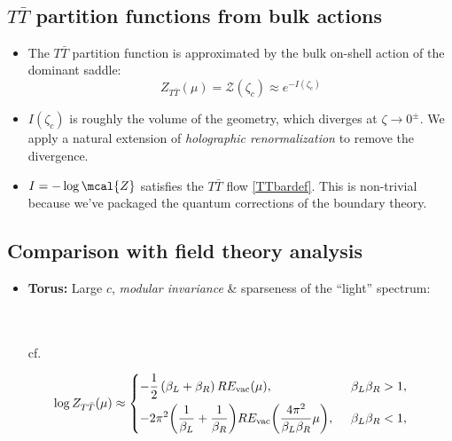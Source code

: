 \documentclass[10pt]{article}
\newcommand{\citations}[1]{{\footnotesize#1\par}}
\newcommand{\TTbar}{\texorpdfstring{\ensuremath{T\bar{T}}}{TTbar}\xspace}
\begin{document}
\begin{multicols}{3}
\begin{itemize}
\citations{
\textcite{Giveon:2017nie}\\
\textcite{Apolo:2019zai}
}
\end{itemize}

\subsection*{\TTbar partition functions from bulk actions} \label{se:partitionfunction}

\citations{
\textcite{Caputa:2020lpa}
}

\begin{itemize}
\item The \TTbar partition function is approximated by the bulk on-shell action of the dominant saddle:
	\begin{equation}
		Z_{T\bar T} (\mu) = \mathcal Z (\zeta_c) \approx  e^{-I(\zeta_c)}\label{partition2}
	\end{equation}


\item $I(\zeta_c)$ is roughly the volume of the geometry, which \mbox{diverges} at $\zeta \to 0^\pm$. We apply a natural extension of \textit{holographic renormalization} to remove the divergence.


\item $I = -\log \mcal{Z}$ satisfies the \TTbar flow \eqref{TTbardef}.
	This is non-trivial because we've packaged the quantum corrections of the boundary theory.
\end{itemize}

\subsection*{Comparison with field theory analysis}



\begin{itemize}
\item \textbf{Torus:} Large $c$, \textit{modular invariance} \& sparseness of the ``light'' spectrum:

\citations{
	\textcite{Datta:2018thy}\\
	\textcite{Apolo:2023aho}\\
	cf.~\textcite{Hartman:2014oaa}
}\vspace{-\baselineskip}
	\begin{equation*}
	\hspace{-1.5em}
		\log   Z_{T\bar T}(\mu)  \approx \left\{ \begin{aligned}
		& {-\frac{1}{2}}\,(\beta_L + \beta_R)\, RE_{\text{vac}}(\mu),  &\beta_L \beta_R > 1, \\
		& {-2 \pi^2 \bigg(\frac{1}{\beta_L} + \frac{1}{\beta_R}\bigg)  RE_{\text{vac}}\bigg(\frac{4\pi^2}{\beta_L \beta_R} \mu \bigg)}, \ \, &\beta_L\beta_R < 1, %
		 \end{aligned} \right. %
	\end{equation*}
	

\end{itemize}
\end{multicols}
\end{document}
